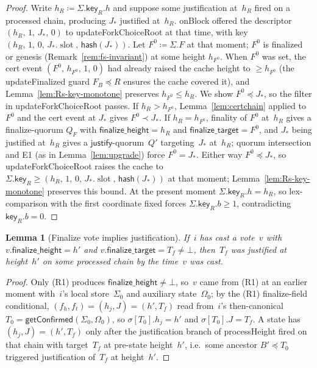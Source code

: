 \ifx\litemode\undefined\documentclass{article}\fi
\newcommand{\slot}[0]{\ensuremath{\operatorname{\mathrm{slot}}}}
\newcommand{\just}{\ensuremath{\mathsf{justify}}\xspace}
\newcommand{\finalizeHeight}{\mathsf{finalize\_height}}
\newcommand{\finalizeTarget}{\mathsf{finalize\_target}}
\newcommand{\hash}{\mathsf{hash}}
\newcommand{\key}{\mathsf{key}}
\newcommand{\processHeight}{\textsf{processHeight}\xspace}
\newcommand{\onBlock}{\textsf{onBlock}\xspace}
\newcommand{\updateForkChoiceRoot}{\textsf{updateForkChoiceRoot}\xspace}
\newcommand{\updateFinalized}{\textsf{updateFinalized}\xspace}
\newcommand{\getConfirmed}{\textsf{getConfirmed}\xspace}
\theoremstyle{plain}
\newtheorem{lemma}{Lemma}
\theoremstyle{definition}
\theoremstyle{remark}
\begin{document}
\begin{proof}
Write $h_R \coloneqq \Sigma.\key_R.h$ and suppose some justification at~$h_R$ fired on a processed chain, producing $J_\ast$ justified at~$h_R$.
\onBlock offered the descriptor $(h_R,\, 1,\, J_\ast,\, 0)$ to \updateForkChoiceRoot at that time, with key $(h_R,\, 1,\, 0,\, J_\ast.\slot,\, \hash(J_\ast))$.
Let $F^0 \coloneqq \Sigma.F$ at that moment; $F^0$ is finalized or genesis (Remark~\ref{rem:fs-invariant}) at some height $h_{F^0}$.
When $F^0$ was set, the cert event $(F^0,\, h_{F^0},\, 1,\, 0)$ had already raised the cache height to $\geq h_{F^0}$ (the \updateFinalized guard $F_B \preceq R$ ensures the cache covered it), and Lemma~\ref{lem:Rs-key-monotone} preserves $h_{F^0} \leq h_R$.
We show $F^0 \preceq J_\ast$, so the filter in \updateForkChoiceRoot passes.
If $h_R > h_{F^0}$, Lemma~\ref{lem:certchain} applied to $F^0$ and the cert event at $J_\ast$ gives $F^0 \prec J_\ast$.
If $h_R = h_{F^0}$, finality of $F^0$ at~$h_R$ gives a finalize-quorum $Q_F$ with $\finalizeHeight = h_R$ and $\finalizeTarget = F^0$, and $J_\ast$ being justified at~$h_R$ gives a \just-quorum~$Q'$ targeting~$J_\ast$ at~$h_R$; quorum intersection and E1 (as in Lemma~\ref{lem:upgrade}) force $F^0 = J_\ast$.
Either way $F^0 \preceq J_\ast$, so \updateForkChoiceRoot raises the cache to $\Sigma.\key_R \geq (h_R,\, 1,\, 0,\, J_\ast.\slot,\, \hash(J_\ast))$ at that moment; Lemma~\ref{lem:Rs-key-monotone} preserves this bound.
At the present moment $\Sigma.\key_R.h = h_R$, so lex-comparison with the first coordinate fixed forces $\Sigma.\key_R.b \geq 1$, contradicting $\key_R.b = 0$.
\end{proof}

\begin{lemma}[Finalize vote implies justification]\label{lem:no-finalize-without-just}
If~$i$ has cast a vote~$v$ with $v.\finalizeHeight = h'$ and $v.\finalizeTarget = T_f \neq \bot$, then~$T_f$ was justified at height~$h'$ on some processed chain by the time~$v$ was cast.
\end{lemma}

\begin{proof}
Only (R1) produces $\finalizeHeight \neq \bot$, so~$v$ came from (R1) at an earlier moment with~$i$'s local store~$\Sigma_0$ and auxiliary state~$\Omega_0$; by the (R1) finalize-field conditional, $(f_h, f_t) = (h_j, J) = (h', T_f)$ read from~$i$'s then-canonical $T_0 = \getConfirmed(\Sigma_0, \Omega_0)$, so $\sigma[T_0].h_j = h'$ and $\sigma[T_0].J = T_f$.
A state has $(h_j, J) = (h', T_f)$ only after the justification branch of \processHeight fired on that chain with target~$T_f$ at pre-state height~$h'$, i.e.\ some ancestor $B' \preceq T_0$ triggered justification of~$T_f$ at height~$h'$.
\end{proof}
\end{document}
